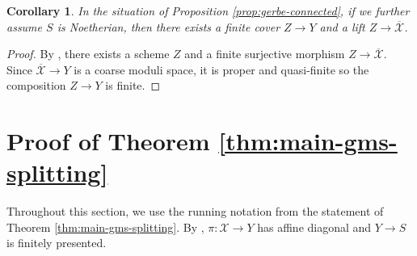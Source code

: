 \documentclass{amsart}
\newtheorem{corollary}[corollary]{Corollary}
\theoremstyle{definition}
\newcommand{\cX}{\mathcal{X}}
\begin{document}
	
	\begin{corollary}\label{cor:gerbe-conn-split}
		In the situation of Proposition \ref{prop:gerbe-connected}, if we further assume $S$ is Noetherian, then there exists a finite cover $Z \to Y$ and a lift $Z \to \overline{\cX}$.  
	\end{corollary}
	
	\begin{proof}
		By \cite[Theorem 2.7]{EHKV}, there exists a scheme $Z$ and a finite surjective morphism $Z \to \overline{\cX}$. Since $\overline{\cX} \to Y$ is a coarse moduli space, it is proper and quasi-finite so the composition $Z \to Y$ is finite. 
	\end{proof}
	
	\section{Proof of Theorem \ref{thm:main-gms-splitting}}
	
	Throughout this section, we use the running notation from the statement of Theorem \ref{thm:main-gms-splitting}. 
	By \cite[Theorem 6.1]{AHRetalelocal}, $\pi\colon\cX\to Y$ has affine diagonal and $Y\to S$ is finitely presented.
	
\end{document}
